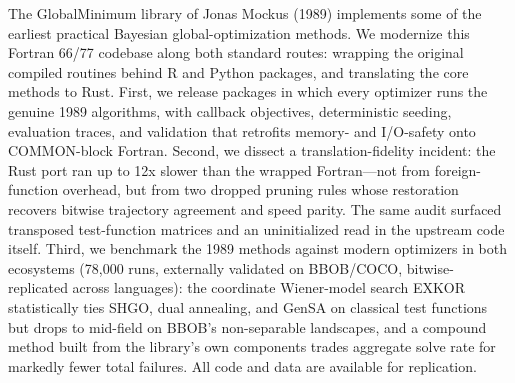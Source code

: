 The GlobalMinimum library of Jonas Mockus (1989) implements some of the
earliest practical Bayesian global-optimization methods. We modernize
this Fortran 66/77 codebase along both standard routes: wrapping the
original compiled routines behind R and Python packages, and
translating the core methods to Rust. First, we release packages in
which every optimizer runs the genuine 1989 algorithms, with callback
objectives, deterministic seeding, evaluation traces, and validation
that retrofits memory- and I/O-safety onto COMMON-block Fortran.
Second, we dissect a translation-fidelity incident: the Rust port ran
up to 12x slower than the wrapped Fortran---not from foreign-function
overhead, but from two dropped pruning rules whose restoration recovers
bitwise trajectory agreement and speed parity. The same audit surfaced
transposed test-function matrices and an uninitialized read in the
upstream code itself. Third, we benchmark the 1989 methods against
modern optimizers in both ecosystems (78,000 runs, externally validated
on BBOB/COCO, bitwise-replicated across languages): the coordinate
Wiener-model search EXKOR statistically ties SHGO, dual annealing, and
GenSA on classical test functions but drops to mid-field on BBOB's
non-separable landscapes, and a compound method built from the
library's own components trades aggregate solve rate for markedly
fewer total failures. All code and data are available for replication.
